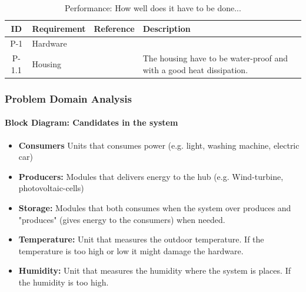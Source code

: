 		\begin{table}[h!]
			\begin{tabular} [b] {| c | p{3cm} | c | p{10cm} |}
			\hline
			\textbf{ID} & \textbf{Requirement} & \textbf{Reference} & \textbf{Description} \\ \hline
			P-1 & Hardware &  &  \\ \hline
			P-1.1 & Housing &  & The housing have to be water-proof and with a good heat dissipation. \\ \hline
		\end{tabular}
		\caption{Performance: How well does it have to be done...}
		\end{table}
		\newpage
	\subsubsection{Problem Domain Analysis}
			\paragraph{Block Diagram: Candidates in the system}
			\begin{itemize}
				\item \textbf{Consumers} Units that consumes power (e.g. light, washing machine, electric car)
				\item \textbf{Producers:} Modules that delivers energy to the hub (e.g. Wind-turbine, photovoltaic-cells)
				\item \textbf{Storage:} Modules that both consumes when the system over produces and "produces" (gives energy to the consumers) when needed. 
				\item \textbf{Temperature:} Unit that measures the outdoor temperature. If the temperature is too high or low it might damage the hardware.
				\item \textbf{Humidity:} Unit that measures the humidity where the system is places. If the humidity is too high.
			\end{itemize}
